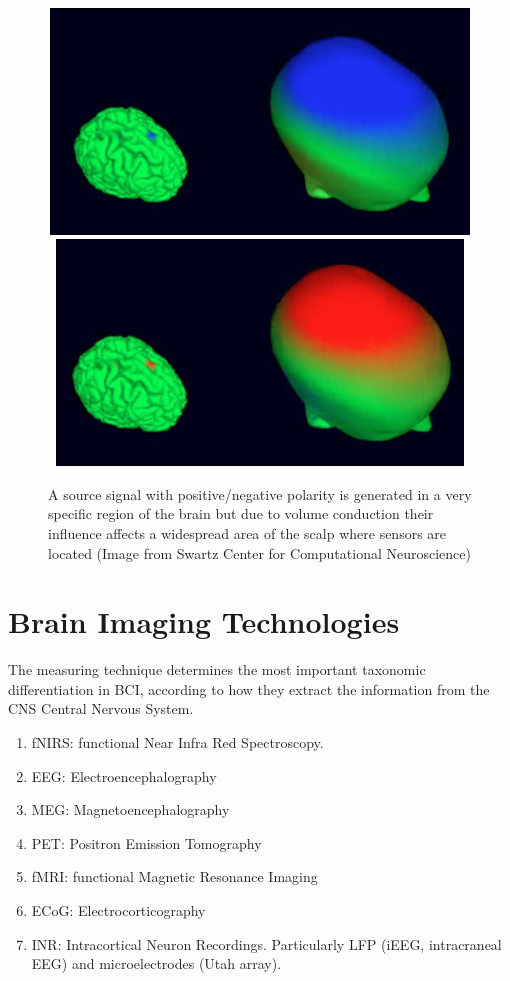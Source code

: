 \begin{figure}[]
\centering
\includegraphics[height=6cm,width=14cm]{images/volconduction1.png}
\includegraphics[height=6cm,width=14cm]{images/volconduction2.png}
\caption[EEG Volume Conduction]{A source signal with positive/negative polarity is generated in a very specific region of the brain but due to volume conduction their influence affects a widespread area of the scalp where sensors are located (Image from Swartz Center for Computational Neuroscience) }
\label{fig:volconduction}
\end{figure}

\section{Brain Imaging Technologies}

The measuring technique determines the most important taxonomic differentiation in BCI, according to how they extract the information from the CNS Central Nervous System.

\begin{enumerate}
\item fNIRS: functional Near Infra Red Spectroscopy.
\item EEG: Electroencephalography
\item MEG: Magnetoencephalography
\item PET: Positron Emission Tomography
\item fMRI: functional Magnetic Resonance Imaging
\item ECoG: Electrocorticography 
\item INR: Intracortical Neuron Recordings.  Particularly LFP (iEEG, intracraneal EEG\cite{Buzsaki2012}) and microelectrodes (Utah array).
\end{enumerate}

